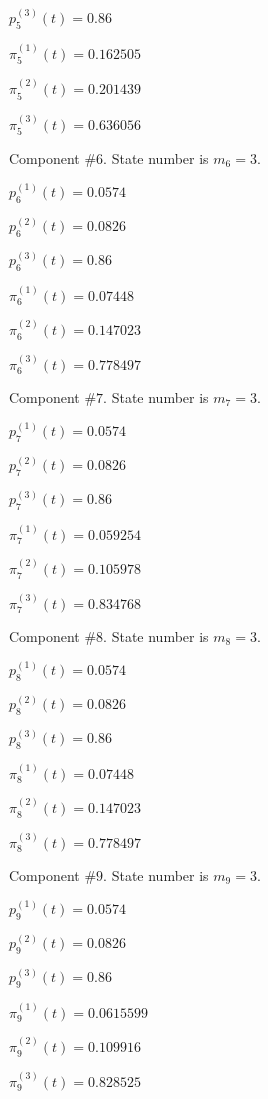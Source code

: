  $p^{(3)}_5(t)=0.86$

 $\pi^{(1)}_5(t)=0.162505$

 $\pi^{(2)}_5(t)=0.201439$

 $\pi^{(3)}_5(t)=0.636056$

 Component #$6$. State number is $m_6=3$.

 $p^{(1)}_6(t)=0.0574$

 $p^{(2)}_6(t)=0.0826$

 $p^{(3)}_6(t)=0.86$

 $\pi^{(1)}_6(t)=0.07448$

 $\pi^{(2)}_6(t)=0.147023$

 $\pi^{(3)}_6(t)=0.778497$

 Component #$7$. State number is $m_7=3$.

 $p^{(1)}_7(t)=0.0574$

 $p^{(2)}_7(t)=0.0826$

 $p^{(3)}_7(t)=0.86$

 $\pi^{(1)}_7(t)=0.059254$

 $\pi^{(2)}_7(t)=0.105978$

 $\pi^{(3)}_7(t)=0.834768$

 Component #$8$. State number is $m_8=3$.

 $p^{(1)}_8(t)=0.0574$

 $p^{(2)}_8(t)=0.0826$

 $p^{(3)}_8(t)=0.86$

 $\pi^{(1)}_8(t)=0.07448$

 $\pi^{(2)}_8(t)=0.147023$

 $\pi^{(3)}_8(t)=0.778497$

 Component #$9$. State number is $m_9=3$.

 $p^{(1)}_9(t)=0.0574$

 $p^{(2)}_9(t)=0.0826$

 $p^{(3)}_9(t)=0.86$

 $\pi^{(1)}_9(t)=0.0615599$

 $\pi^{(2)}_9(t)=0.109916$

 $\pi^{(3)}_9(t)=0.828525$